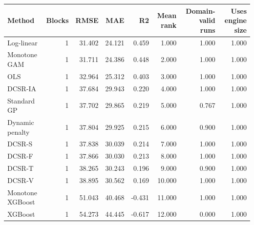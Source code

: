 \begin{tabular}{lrrrrrrr}
\toprule
Method & Blocks & RMSE & MAE & R2 & Mean rank & Domain-valid runs & Uses engine size \\
\midrule
Log-linear & 1 & 31.402 & 24.121 & 0.459 & 1.000 & 1.000 & 1.000 \\
Monotone GAM & 1 & 31.711 & 24.386 & 0.448 & 2.000 & 1.000 & 1.000 \\
OLS & 1 & 32.964 & 25.312 & 0.403 & 3.000 & 1.000 & 1.000 \\
DCSR-IA & 1 & 37.684 & 29.943 & 0.220 & 4.000 & 1.000 & 1.000 \\
Standard GP & 1 & 37.702 & 29.865 & 0.219 & 5.000 & 0.767 & 1.000 \\
Dynamic penalty & 1 & 37.804 & 29.925 & 0.215 & 6.000 & 0.900 & 1.000 \\
DCSR-S & 1 & 37.838 & 30.039 & 0.214 & 7.000 & 1.000 & 1.000 \\
DCSR-F & 1 & 37.866 & 30.030 & 0.213 & 8.000 & 1.000 & 1.000 \\
DCSR-T & 1 & 38.265 & 30.243 & 0.196 & 9.000 & 0.900 & 1.000 \\
DCSR-V & 1 & 38.895 & 30.562 & 0.169 & 10.000 & 1.000 & 1.000 \\
Monotone XGBoost & 1 & 51.043 & 40.468 & -0.431 & 11.000 & 1.000 & 1.000 \\
XGBoost & 1 & 54.273 & 44.445 & -0.617 & 12.000 & 0.000 & 1.000 \\
\bottomrule
\end{tabular}
